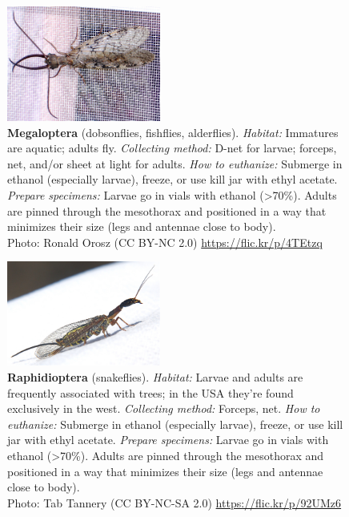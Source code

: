 \documentclass[letterpaper, 11pt]{article}
\begin{document}
\begin{figure}
  \caption{\textbf{Megaloptera} (dobsonflies, fishflies, alderflies). \textit{Habitat:} Immatures are aquatic; adults fly. \textit{Collecting method:} D-net for larvae; forceps, net, and/or sheet at light for adults. \textit{How to euthanize:} Submerge in ethanol (especially larvae), freeze, or use kill jar with ethyl acetate. \textit{Prepare specimens:} Larvae go in vials with ethanol (\textgreater70\%). Adults are pinned through the mesothorax and positioned in a way that minimizes their size (legs and antennae close to body).\\ Photo: Ronald Orosz (CC BY-NC 2.0) \url{https://flic.kr/p/4TEtzq}}
  \includegraphics[width=0.45\textwidth]{Megaloptera}
\end{figure}

\begin{figure}
  \caption{\textbf{Raphidioptera} (snakeflies). \textit{Habitat:} Larvae and adults are frequently associated with trees; in the USA they're found exclusively in the west. \textit{Collecting method:} Forceps, net. \textit{How to euthanize:} Submerge in ethanol (especially larvae), freeze, or use kill jar with ethyl acetate. \textit{Prepare specimens:} Larvae go in vials with ethanol (\textgreater70\%). Adults are pinned through the mesothorax and positioned in a way that minimizes their size (legs and antennae close to body).\\ Photo: Tab Tannery (CC BY-NC-SA 2.0) \url{https://flic.kr/p/92UMz6}}
  \includegraphics[width=0.45\textwidth]{Raphidioptera}
\end{figure}
\end{document}
